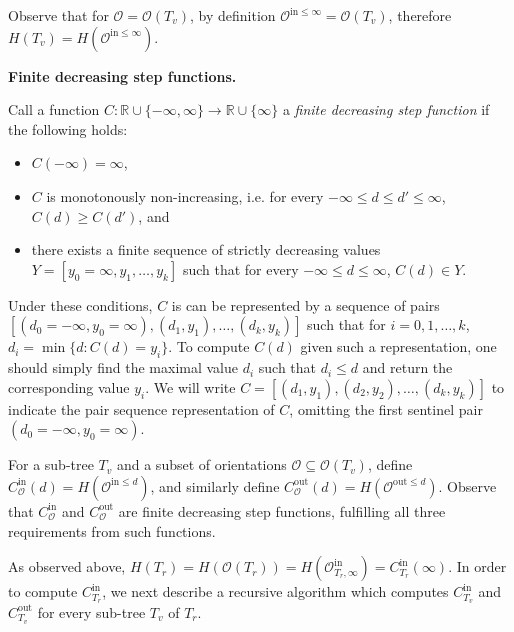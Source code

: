 
Observe that for $\mathcal{O} = \mathcal{O}(T_v)$, by definition $\mathcal{O}^{\text{in} \leq \infty} = \mathcal{O}(T_v)$, therefore $H(T_v) = H(\mathcal{O}^{\text{in} \leq \infty})$.

\bigskip
\textbf{Finite decreasing step functions.}

Call a function $C: \mathbb{R} \cup \{-\infty, \infty\} \rightarrow \mathbb{R} \cup \{\infty\}$ a \emph{finite decreasing step function} if the following holds:
\begin{itemize}
	\item $C(-\infty) = \infty$,
	\item $C$ is monotonously non-increasing, i.e. for every $-\infty \leq d \leq d' \leq \infty$, $C(d) \geq C(d')$, and
	\item there exists a finite sequence of strictly decreasing values $Y = [y_0 = \infty, y_1, \ldots, y_k]$ such that for every $-\infty \leq d \leq \infty$, $C(d) \in Y$.
\end{itemize}

Under these conditions, $C$ is can be represented by a sequence of pairs $[(d_0 = -\infty, y_0 = \infty), (d_1, y_1), \ldots, (d_k, y_k)]$ such that for $i = 0, 1, \ldots, k$, $d_i = \min\{d : C(d) = y_i\}$. To compute $C(d)$ given such a representation, one should simply find the maximal value $d_i$ such that $d_i \leq d$ and return the corresponding value $y_i$. We will write $C = [(d_1, y_1), (d_2, y_2), \ldots, (d_k, y_k)]$ to indicate the pair sequence representation of $C$, omitting the first sentinel pair $(d_0 = -\infty, y_0 = \infty)$.

For a sub-tree $T_v$ and a subset of orientations $\mathcal{O} \subseteq \mathcal{O}(T_v)$, define $C^\text{in}_{\mathcal{O}}(d) = H(\mathcal{O}^{\text{in} \leq d})$, and similarly define $C^\text{out}_{\mathcal{O}}(d) = H(\mathcal{O}^{\text{out} \leq d})$. Observe that $C^\text{in}_{\mathcal{O}}$ and $C^\text{out}_{\mathcal{O}}$ are finite decreasing step functions, fulfilling all three requirements from such functions. 

As observed above, $H(T_r) = H(\mathcal{O}(T_r)) = H(\mathcal{O}^\text{in}_{T_r, \infty}) = C^\text{in}_{T_r}(\infty)$. In order to compute $C^\text{in}_{T_r}$, we next describe a recursive algorithm which computes $C^\text{in}_{T_v}$ and $C^\text{out}_{T_v}$ for every sub-tree $T_v$ of $T_r$.



